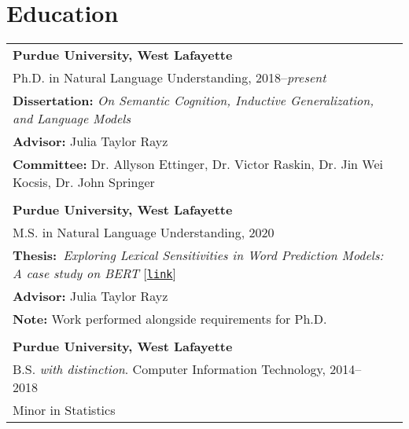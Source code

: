 \documentclass[11pt]{article}
\begin{document}
\section*{Education}
\begin{tabularx}{\textwidth}{@{}p{\textwidth}l}
\textbf{Purdue University, West Lafayette}\\
Ph.D. in Natural Language Understanding, 2018--\textit{present}\\
\textbf{Dissertation:} \textit{On Semantic Cognition, Inductive Generalization, and Language Models}\\
\textbf{Advisor:} Julia Taylor Rayz\\
\textbf{Committee:} Dr. Allyson Ettinger, Dr. Victor Raskin, Dr. Jin Wei Kocsis, Dr. John Springer\\\\
\textbf{Purdue University, West Lafayette}\\
M.S. in Natural Language Understanding, 2020\\
\textbf{Thesis:}~\textit{Exploring Lexical Sensitivities in Word Prediction Models: A case study on BERT} [\href{https://hammer.figshare.com/articles/thesis/Exploring_Lexical_Sensitivities_in_Word_Prediction_Models_A_case_study_on_BERT/13308830}{\texttt{link}}]\\
\textbf{Advisor:} Julia Taylor Rayz\\
\textbf{Note:} Work performed alongside requirements for Ph.D.\\\\

\textbf{Purdue University, West Lafayette}\\
B.S. \textit{with distinction}. Computer Information Technology, 2014--2018\\
Minor in Statistics
\end{tabularx}
\end{document}
